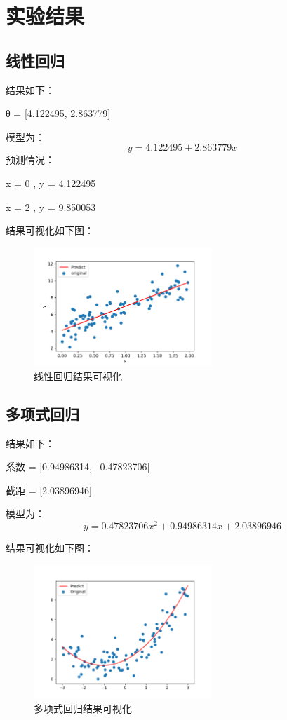 \documentclass{../source/Experiment}
\begin{document}
    \section{实验结果}
    \subsection{线性回归}

    结果如下：
    
    θ = [4.122495, 2.863779]

    模型为：
    $$ y = 4.122495 + 2.863779x$$
    预测情况：

    x = 0 , y = 4.122495

    x = 2 , y = 9.850053


    结果可视化如下图：
    \begin{figure}[H]
        \centering
        \includegraphics[width = 0.6\textwidth]{Part2/figure1.png}
        \caption{线性回归结果可视化}
    \end{figure}

    \subsection{多项式回归}
    结果如下： 

    系数 = [0.94986314, \, 0.47823706]

    截距 = [2.03896946]

    模型为：
    $$ y = 0.47823706x^2 + 0.94986314x + 2.03896946$$    

    结果可视化如下图：
    \begin{figure}[H]
        \centering
        \includegraphics[width = 0.6\textwidth]{Part2/figure2.png}
        \caption{多项式回归结果可视化}
    \end{figure}
\end{document}
